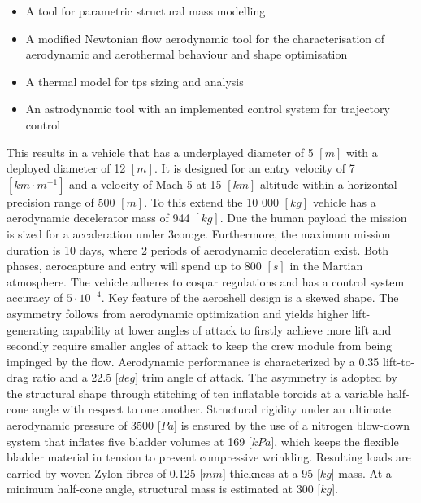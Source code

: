 \begin{itemize}
\item A tool for parametric structural mass modelling
\item A modified Newtonian flow aerodynamic tool for the characterisation of aerodynamic and aerothermal behaviour and shape optimisation
\item A thermal model for \acrfull{tps} sizing and analysis
\item An astrodynamic tool with an implemented control system for trajectory control
\end{itemize}
\vspace{1mm}
This results in a vehicle that has a underplayed diameter of 5 $ \left[ m \right] $ with a deployed diameter of 12 $ \left[ m \right] $. It is designed for an entry velocity of 7 $ \left[ km \cdot m^{-1} \right] $ and a velocity of Mach 5 at  15 $ \left[ km \right] $ altitude within a horizontal precision range of 500 $ \left[ m \right] $. To this extend the 10 000 $ \left[ kg \right] $ vehicle has a aerodynamic decelerator mass of 944 $ \left[ kg \right] $. Due the human payload the mission is sized for a accaleration under 3\gls{con:ge}. Furthermore, the maximum mission duration is 10 days, where 2 periods of aerodynamic deceleration exist. Both phases, aerocapture and entry will spend up to 800 $ \left[ s \right] $ in the Martian atmosphere. The vehicle adheres to \acrshort{cospar} regulations and has a control system accuracy of $ 5 \cdot 10^{-4} $.
\newline
\newline
Key feature of the aeroshell design is a skewed shape. The asymmetry follows from aerodynamic optimization and yields higher lift-generating capability at lower angles of attack to firstly achieve more lift and secondly require smaller angles of attack to keep the crew module from being impinged by the flow. Aerodynamic performance is characterized by a 0.35 lift-to-drag ratio and a 22.5 [$deg$] trim angle of attack.
\newline
\newline
The asymmetry is adopted by the structural shape through stitching of ten inflatable toroids at a variable half-cone angle with respect to one another. Structural rigidity under an ultimate aerodynamic pressure of 3500 [$Pa$] is ensured by the use of a nitrogen blow-down system that inflates five bladder volumes at 169 [$kPa$], which keeps the flexible bladder material in tension to prevent compressive wrinkling. Resulting loads are carried by woven Zylon fibres of 0.125 [$mm$] thickness at a 95 [$kg$] mass. At a minimum half-cone angle,  structural mass is estimated at 300 [$kg$]. 
